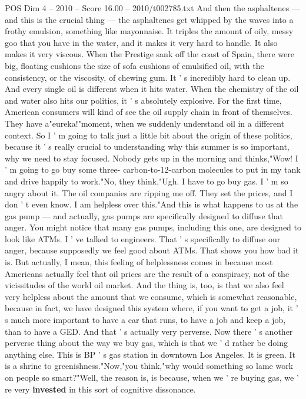 \begin{textsample}{POS Dim 4 – 2010 – Score 16.00 – 2010/t002785.txt}
And then the asphaltenes — and this is the crucial thing — the asphaltenes get whipped by the waves into a frothy emulsion, something like mayonnaise.
It triples the amount of oily, messy goo that you have in the water, and it makes it very hard to handle.
It also makes it very viscous.
When the Prestige sank off the coast of Spain, there were big, floating cushions the size of sofa cushions of emulsified oil, with the consistency, or the viscosity, of chewing gum.
It ' s incredibly hard to clean up.
And every single oil is different when it hits water.
When the chemistry of the oil and water also hits our politics, it ' s absolutely explosive.
For the first time, American consumers will kind of see the oil supply chain in front of themselves.
They have a"eureka!"moment, when we suddenly understand oil in a different context.
So I ' m going to talk just a little bit about the origin of these politics, because it ' s really crucial to understanding why this summer is so important, why we need to stay focused.
Nobody gets up in the morning and thinks,"Wow!
I ' m going to go buy some three- carbon-to-12-carbon molecules to put in my tank and drive happily to work."No, they think,"Ugh.
I have to go buy gas.
I ' m so angry about it.
The oil companies are ripping me off.
They set the prices, and I don ' t even know.
I am helpless over this."And this is what happens to us at the gas pump — and actually, gas pumps are specifically designed to diffuse that anger.
You might notice that many gas pumps, including this one, are designed to look like ATMs.
I ' ve talked to engineers.
That ' s specifically to diffuse our anger, because supposedly we feel good about ATMs.
That shows you how bad it is.
But actually, I mean, this feeling of helplessness comes in because most Americans actually feel that oil prices are the result of a conspiracy, not of the vicissitudes of the world oil market.
And the thing is, too, is that we also feel very helpless about the amount that we consume, which is somewhat reasonable, because in fact, we have designed this system where, if you want to get a job, it ' s much more important to have a car that runs, to have a job and keep a job, than to have a GED.
And that ' s actually very perverse.
Now there ' s another perverse thing about the way we buy gas, which is that we ' d rather be doing anything else.
This is BP ' s gas station in downtown Los Angeles.
It is green.
It is a shrine to greenishness."Now,"you think,"why would something so lame work on people so smart?"Well, the reason is, is because, when we ' re buying gas, we ' re very \textbf{invested} in this sort of cognitive dissonance.

\end{textsample}
